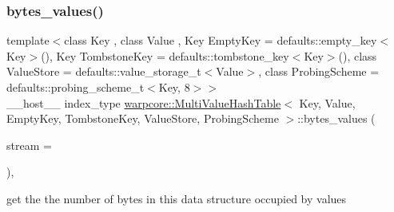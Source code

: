 \subsubsection{\texorpdfstring{bytes\+\_\+values()}{bytes\_values()}}
{\footnotesize\ttfamily template$<$class Key , class Value , Key Empty\+Key = defaults\+::empty\+\_\+key$<$\+Key$>$(), Key Tombstone\+Key = defaults\+::tombstone\+\_\+key$<$\+Key$>$(), class Value\+Store  = defaults\+::value\+\_\+storage\+\_\+t$<$\+Value$>$, class Probing\+Scheme  = defaults\+::probing\+\_\+scheme\+\_\+t$<$\+Key, 8$>$$>$ \\
\+\_\+\+\_\+host\+\_\+\+\_\+ index\+\_\+type \hyperlink{classwarpcore_1_1MultiValueHashTable}{warpcore\+::\+Multi\+Value\+Hash\+Table}$<$ Key, Value, Empty\+Key, Tombstone\+Key, Value\+Store, Probing\+Scheme $>$\+::bytes\+\_\+values (\begin{DoxyParamCaption}\item[{cuda\+Stream\+\_\+t}]{stream = {} }\end{DoxyParamCaption})\hspace{0.3cm}{\ttfamily [inline]}, {\ttfamily [noexcept]}}



get the the number of bytes in this data structure occupied by values 


